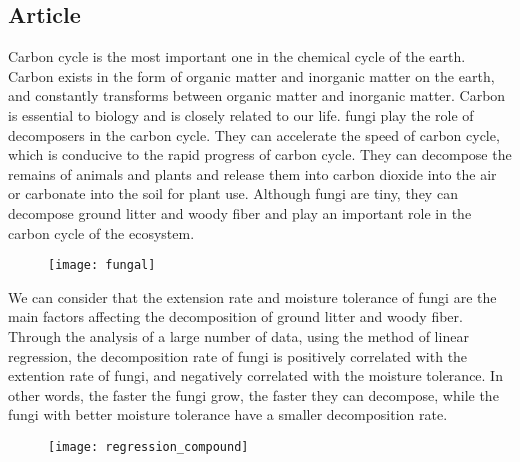 \documentclass{mcmthesis}
\begin{document}
\begin{appendices}

\section{Article}







Carbon cycle is the most important one in the chemical cycle of the earth. Carbon exists in the form of organic matter and inorganic matter on the earth, and constantly transforms between organic matter and inorganic matter. Carbon is essential to biology and is closely related to our life. fungi play the role of decomposers in the carbon cycle. They can accelerate the speed of carbon cycle, which is conducive to the rapid progress of carbon cycle. They can decompose the remains of animals and plants and release them into carbon dioxide into the air or carbonate into the soil for plant use. Although fungi are tiny, they can decompose ground litter and woody fiber and play an important role in the carbon cycle of the ecosystem.

\begin{figure}[H]
  \small
  \centering
  \texttt{[image: fungal]}
  \label{fungal}
\end{figure}

We can consider that the extension rate and moisture tolerance of fungi are the main factors affecting the decomposition of ground litter and woody fiber. Through the analysis of a large number of data, using the method of linear regression, the decomposition rate of fungi is positively correlated with the extention rate of fungi, and negatively correlated with the moisture tolerance. In other words, the faster the fungi grow, the faster they can decompose, while the fungi with better moisture tolerance have a smaller decomposition rate.

\begin{figure}[H]
  \small
  \centering
  \texttt{[image: regression\_compound]}
  \label{regression_compound}
\end{figure}


\end{appendices}
\end{document}
